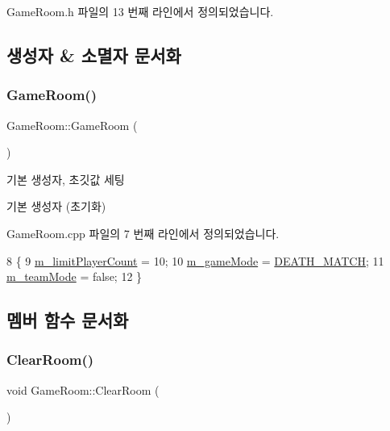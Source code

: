 Game\+Room.\+h 파일의 13 번째 라인에서 정의되었습니다.



\subsection{생성자 \& 소멸자 문서화}
\mbox{\label{class_game_room_a7b885c42c8215fa1de563f51a35592ed}} 
\subsubsection{\texorpdfstring{Game\+Room()}{GameRoom()}}
{\footnotesize\ttfamily Game\+Room\+::\+Game\+Room (\begin{DoxyParamCaption}{ }\end{DoxyParamCaption})}



기본 생성자, 초깃값 세팅 

기본 생성자 (초기화) 

Game\+Room.\+cpp 파일의 7 번째 라인에서 정의되었습니다.


\begin{DoxyCode}
8 \{
9     \hyperlink{class_game_room_ae03c39da189ee9097af8ee4cde8ba373}{m\_limitPlayerCount} = 10;
10     \hyperlink{class_game_room_a47c8f21ede7fd6fa526ebfcb069dcf45}{m\_gameMode} = \hyperlink{stdafx_8h_aaf5ef5a17b53e9997c837b07015589dea1497504d1bce0665a103b5cca3e89ea7}{DEATH\_MATCH};
11     \hyperlink{class_game_room_aef7875998ee1bf83eb23e249b5659bc7}{m\_teamMode} = \textcolor{keyword}{false};
12 \}
\end{DoxyCode}


\subsection{멤버 함수 문서화}
\mbox{\label{class_game_room_a3dd806c7382efd9ffd353ab152113d69}} 
\subsubsection{\texorpdfstring{Clear\+Room()}{ClearRoom()}}
{\footnotesize\ttfamily void Game\+Room\+::\+Clear\+Room (\begin{DoxyParamCaption}{ }\end{DoxyParamCaption})}



